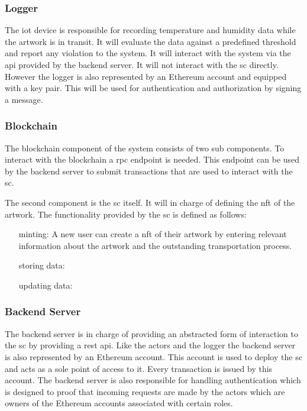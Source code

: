 \subsubsection{Logger}
The \gls{iot} device is responsible for recording temperature and humidity data while the artwork is in transit. It will evaluate the data against a predefined threshold and report any violation to the system. It will interact with the system via the \gls{api} provided by the backend server. It will not interact with the \gls{sc} directly. However the logger is also represented by an Ethereum account and equipped with a key pair. This will be used for authentication and authorization by signing a message.

\subsubsection{Blockchain}
The blockchain component of the system consists of two sub components. To interact with the blockchain a \gls{rpc} endpoint is needed. This endpoint can be used by the backend server to submit transactions that are used to interact with the \gls{sc}.

The second component is the \gls{sc} itself. It will in charge of defining the \gls{nft} of the artwork. %
The functionality provided by the \gls{sc} is defined as follows:

\begin{itemize}[align=left, font=\textit]
    \item[minting:] A new user can create a \gls{nft} of their artwork by entering relevant information about the artwork and the outstanding transportation process.
    \item[storing data:] 
    \item[updating data:]
\end{itemize}

\subsubsection{Backend Server}
The backend server is in charge of providing an abstracted form of interaction to the \gls{sc} by providing a \gls{rest} \gls{api}. Like the actors and the logger the backend server is also represented by an Ethereum account. This account is used to deploy the \gls{sc} and acts as a sole point of access to it. Every transaction is issued by this account. The backend server is also responsible for handling authentication which is designed to proof that incoming requests are made by the actors which are owners of the Ethereum accounts associated with certain roles.

